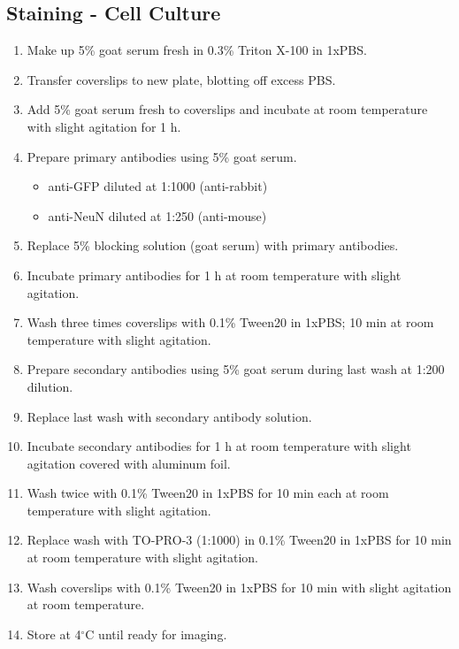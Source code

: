 \subsection{Staining - Cell Culture}
\begin{enumerate}
\item Make up 5\% goat serum fresh in 0.3\% Triton X-100 in 1xPBS.
\item Transfer coverslips to new plate, blotting off excess PBS.
\item Add 5\% goat serum fresh to coverslips and incubate at room temperature with slight agitation for 1 h.
\item Prepare primary antibodies using 5\% goat serum.
  \begin{itemize}
  \item anti-GFP diluted at 1:1000 (anti-rabbit)
  \item anti-NeuN diluted at 1:250 (anti-mouse)
  \end{itemize}
\item Replace 5\% blocking solution (goat serum) with primary antibodies\footnotemark.
\item Incubate primary antibodies for 1 h at room temperature with slight agitation.
\item Wash three times coverslips with 0.1\% Tween20 in 1xPBS; 10 min at room temperature with slight agitation.
\item Prepare secondary antibodies using 5\% goat serum during last wash at 1:200 dilution.
\item Replace last wash with secondary antibody solution.
\item Incubate secondary antibodies for 1 h at room temperature with slight agitation covered with aluminum foil\footnotemark.
\item Wash twice with 0.1\% Tween20 in 1xPBS for 10 min each at room temperature with slight agitation.
\item Replace wash with TO-PRO-3 (1:1000) in 0.1\% Tween20 in 1xPBS for 10 min at room temperature with slight agitation.
\item Wash coverslips with 0.1\% Tween20 in 1xPBS for 10 min with slight agitation at room temperature.
\item Store at 4$^{\circ}$C until ready for imaging.
\end{enumerate}

\pagebreak

